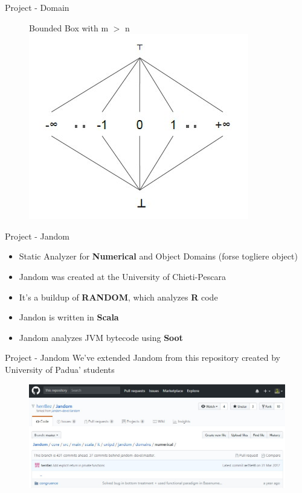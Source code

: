 \documentclass{beamer}
\begin{document}
	\begin{frame}{Project - Domain}
		\begin{figure}
			Bounded Box with m $>$ n
	\includegraphics[scale=0.8]{images/constant.jpg}
\end{figure}

\end{frame}

	\begin{frame}{Project - Jandom}
		\begin{itemize}
			\item Static Analyzer for \textbf{Numerical} and Object Domains (forse togliere object)
			\item Jandom was created at the University of Chieti-Pescara
			\item It's a buildup of \textbf{RANDOM}, which analyzes \textbf{R} code
			\item Jandon is written in \textbf{Scala}
			\item Jandom analyzes JVM bytecode using \textbf{Soot}
		\end{itemize}
	\end{frame}

	\begin{frame}{Project - Jandom}
		We've extended Jandom from this repository created by University of Padua' students
		\begin{figure}[c]
			\includegraphics[scale=0.4]{images/repo.jpg}
		\end{figure}
	\end{frame}
\end{document}
